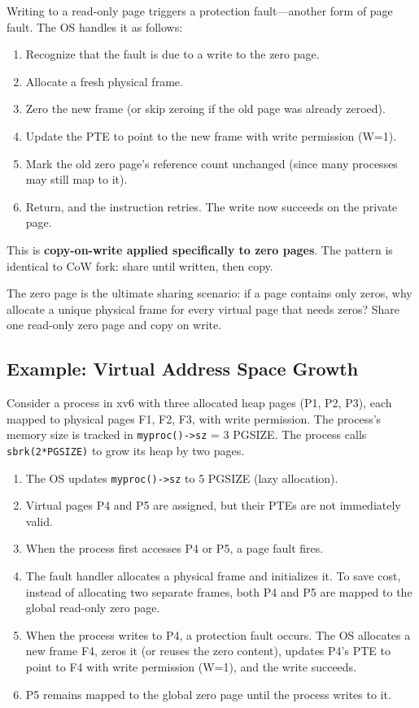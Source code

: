\documentclass[11pt]{article}
\begin{document}
Writing to a read-only page triggers a protection fault---another form of page fault. The OS handles it as follows:

\begin{enumerate}
    \item Recognize that the fault is due to a write to the zero page.
    \item Allocate a fresh physical frame.
    \item Zero the new frame (or skip zeroing if the old page was already zeroed).
    \item Update the PTE to point to the new frame with write permission (W=1).
    \item Mark the old zero page's reference count unchanged (since many processes may still map to it).
    \item Return, and the instruction retries. The write now succeeds on the private page.
\end{enumerate}

This is \textbf{copy-on-write applied specifically to zero pages}. The pattern is identical to CoW fork: share until written, then copy.

\begin{keyintuition}
The zero page is the ultimate sharing scenario: if a page contains only zeros, why allocate a unique physical frame for every virtual page that needs zeros? Share one read-only zero page and copy on write.
\end{keyintuition}

\subsection{Example: Virtual Address Space Growth}

Consider a process in xv6 with three allocated heap pages (P1, P2, P3), each mapped to physical pages F1, F2, F3, with write permission. The process's memory size is tracked in \texttt{myproc()->sz} = 3 PGSIZE. The process calls \texttt{sbrk(2*PGSIZE)} to grow its heap by two pages.

\begin{enumerate}
    \item The OS updates \texttt{myproc()->sz} to 5 PGSIZE (lazy allocation).
    \item Virtual pages P4 and P5 are assigned, but their PTEs are not immediately valid.
    \item When the process first accesses P4 or P5, a page fault fires.
    \item The fault handler allocates a physical frame and initializes it. To save cost, instead of allocating two separate frames, both P4 and P5 are mapped to the global read-only zero page.
    \item When the process writes to P4, a protection fault occurs. The OS allocates a new frame F4, zeros it (or reuses the zero content), updates P4's PTE to point to F4 with write permission (W=1), and the write succeeds.
    \item P5 remains mapped to the global zero page until the process writes to it.
\end{enumerate}
\end{document}
